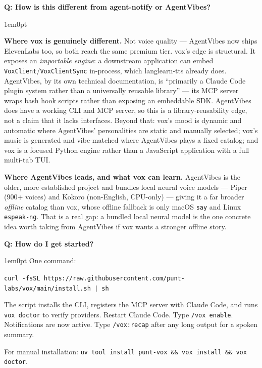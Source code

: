 \documentclass[11pt,letterpaper]{article}
\newcounter{faqnum}
\newenvironment{faqpair}[1]{%
  \needspace{4\baselineskip}%
  \vspace{0.5em}%
  \refstepcounter{faqnum}%
  \noindent\textbf{\color{SectionBlue}Q\thefaqnum: #1}\par\nopagebreak[4]%
  \vspace{0.2em}%
  \begin{adjustwidth}{1em}{0pt}%
  \setlength{\parindent}{0pt}%
}{%
  \end{adjustwidth}%
  \vspace{0.5em}%
}
\begin{document}
\begin{faqpair}{How is this different from agent-notify or AgentVibes?}
  \textbf{Where vox is genuinely different.} Not voice quality --- AgentVibes
  now ships ElevenLabs too, so both reach the same premium tier. vox's edge is
  structural. It exposes an \emph{importable engine}: a downstream application
  can embed \texttt{VoxClient}/\texttt{VoxClientSync} in-process, which
  langlearn-tts already does. AgentVibes, by its own technical documentation, is
  ``primarily a Claude Code plugin system rather than a universally reusable
  library'' \cite{agentvibes2026technicaldeepdive} --- its MCP server wraps bash
  hook scripts rather than exposing an embeddable SDK. AgentVibes does have a
  working CLI and MCP server, so this is a library-reusability edge, not a claim
  that it lacks interfaces. Beyond that: vox's mood is dynamic and automatic
  where AgentVibes' personalities are static and manually selected; vox's music
  is generated and vibe-matched where AgentVibes plays a fixed catalog; and vox
  is a focused Python engine rather than a JavaScript application with a full
  multi-tab TUI.

  \textbf{Where AgentVibes leads, and what vox can learn.} AgentVibes is the
  older, more established project and bundles local neural voice models ---
  Piper (900+ voices) and Kokoro (non-English, CPU-only)
  \cite{agentvibes2026providers} --- giving it a far broader \emph{offline}
  catalog than vox, whose offline fallback is only macOS \texttt{say} and Linux
  \texttt{espeak-ng}. That is a real gap: a bundled local neural model is the one
  concrete idea worth taking from AgentVibes if vox wants a stronger offline
  story.
\end{faqpair}

\begin{faqpair}{How do I get started?}\label{faq:getting-started}
  One command:

  {\small\texttt{curl -fsSL https://raw.githubusercontent.com/punt-labs/vox/main/install.sh | sh}}

  The script installs the CLI, registers the MCP server with Claude Code, and
  runs \texttt{vox doctor} to verify providers. Restart Claude Code. Type
  \texttt{/vox enable}. Notifications are now active. Type \texttt{/vox:recap} after
  any long output for a spoken summary.

  For manual installation:
  {\small\texttt{uv tool install punt-vox \&\& vox install \&\& vox doctor}}.
\end{faqpair}
\end{document}
